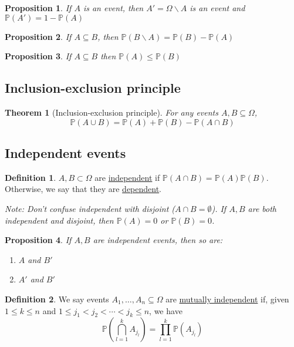 \documentclass[
]{article}
\newtheorem{theorem}{Theorem}[section]
\newtheorem{proposition}{Proposition}[section]
\theoremstyle{definition}
\newtheorem{definition}{Definition}[section]
\theoremstyle{definition}
\theoremstyle{definition}
\theoremstyle{remark}
\newcommand{\prob}[1]{\mathbb{P}\left(#1\right)}
\begin{document}
\begin{proposition}
  If $A$ is an event, then $A'=\Omega\backslash A$ is an event and\\ $\mathbb{P}(A')=1-\mathbb{P}(A)$
\end{proposition}

\begin{proposition}
  If $A\subseteq B$, then $\prob{B\backslash A}=\prob{B}-\prob{A}$
\end{proposition}

\begin{proposition}
  If $A\subseteq B$ then $\prob{A}\leq\prob{B}$
\end{proposition}

\subsection{Inclusion-exclusion principle}
\begin{theorem}[Inclusion-exclusion principle]
  For any events $A,B\subseteq\Omega$,
  \[\prob{A\cup B}=\prob{A}+\prob{B}-\prob{A\cap B}\]
\end{theorem}

\subsection{Independent events}

\begin{definition}
  $A,B\subset\Omega$ are \underline{independent} if $\prob{A\cap B}=\prob{A}\prob{B}$. Otherwise, we say that they are \underline{dependent}.
\end{definition}

\emph{Note: Don't confuse independent with disjoint ($A\cap B=\emptyset$). If $A,B$ are both independent and disjoint, then $\prob{A}=0$ or $\prob{B}=0$.}

\begin{proposition}
  If $A,B$ are independent events, then so are:
  \begin{enumerate}
    \item $A$ and $B'$
    \item $A'$ and $B'$
  \end{enumerate}
\end{proposition}

\begin{definition}
  We say events $A_1,\ldots,A_n\subseteq\Omega$ are \underline{mutually independent} if, given $1\leq k\leq n$ and $1\leq j_1<j_2<\cdots<j_k\leq n$, we have
  \[\prob{\bigcap_{l=1}^k A_{j_l}}=\prod_{l=1}^k \prob{A_{j_l}}\]
\end{definition}
\end{document}
